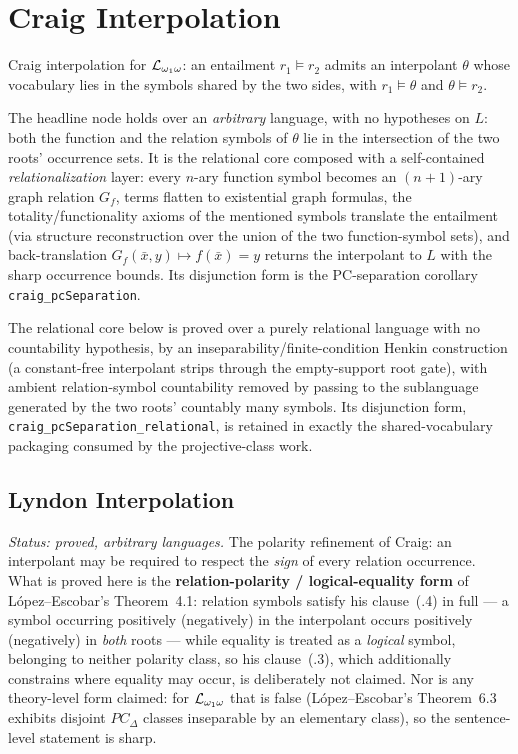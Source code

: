 \chapter{Craig Interpolation}

Craig interpolation for $\mathcal{L}_{\omega_1\omega}$: an entailment $r_1 \models r_2$ admits an
interpolant $\theta$ whose vocabulary lies in the symbols shared by the two
sides, with $r_1 \models \theta$ and $\theta \models r_2$.

The headline node holds over an \emph{arbitrary} language, with no hypotheses on
$L$: both the function and the relation symbols of $\theta$ lie in the
intersection of the two roots' occurrence sets.  It is the relational core
composed with a self-contained \emph{relationalization} layer: every $n$-ary
function symbol becomes an $(n{+}1)$-ary graph relation $G_f$, terms flatten to
existential graph formulas, the totality/functionality axioms of the mentioned
symbols translate the entailment (via structure reconstruction over the union of
the two function-symbol sets), and back-translation $G_f(\bar x,y) \mapsto
f(\bar x){=}y$ returns the interpolant to $L$ with the sharp occurrence bounds.
Its disjunction form is the PC-separation corollary
\texttt{craig\_pcSeparation}.


The relational core below is proved over a purely relational language with no
countability hypothesis, by an inseparability/finite-condition Henkin
construction (a constant-free interpolant strips through the empty-support root
gate), with ambient relation-symbol countability removed by passing to the
sublanguage generated by the two roots' countably many symbols.  Its disjunction
form, \texttt{craig\_pcSeparation\_relational}, is retained in exactly the
shared-vocabulary packaging consumed by the projective-class work.


\section{Lyndon Interpolation}

\emph{Status: proved, arbitrary languages.}  The polarity refinement of Craig: an
interpolant may be required to respect the \emph{sign} of every relation
occurrence.  What is proved here is the \textbf{relation-polarity /
logical-equality form} of L\'opez--Escobar's Theorem~4.1: relation symbols
satisfy his clause~(.4) in full --- a symbol occurring positively (negatively) in
the interpolant occurs positively (negatively) in \emph{both} roots --- while
equality is treated as a \emph{logical} symbol, belonging to neither polarity
class, so his clause~(.3), which additionally constrains where equality may
occur, is deliberately not claimed.  Nor is any theory-level form claimed: for
$\mathcal{L}_{\omega_1\omega}$ that is false (L\'opez--Escobar's Theorem~6.3 exhibits disjoint
$PC_\Delta$ classes inseparable by an elementary class), so the sentence-level
statement is sharp.


